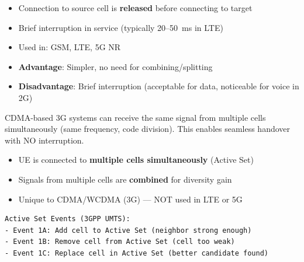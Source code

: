 
\begin{itemize}
\tightlist
\item
  Connection to source cell is \textbf{released} before connecting to target
\item
  Brief interruption in service (typically 20–50~ms in LTE)
\item
  Used in: GSM, LTE, 5G NR
\end{itemize}




\begin{itemize}
\tightlist
\item
  \textbf{Advantage}: Simpler, no need for combining/\allowbreak{}splitting
\item
  \textbf{Disadvantage}: Brief interruption (acceptable for data, noticeable for voice in 2G)
\end{itemize}



\CNchained{}

CDMA-based 3G systems can receive the same signal from multiple cells simultaneously (same frequency, code division). This enables seamless handover with NO interruption.


\begin{itemize}
\tightlist
\item
  UE is connected to \textbf{multiple cells simultaneously} (Active Set)
\item
  Signals from multiple cells are \textbf{combined} for diversity gain
\item
  Unique to CDMA/\allowbreak{}WCDMA (3G) — NOT used in LTE or 5G
\end{itemize}


\def\CNcodelang{}

\begin{CNplaincode}
\begin{Verbatim}
Active Set Events (3GPP UMTS):
- Event 1A: Add cell to Active Set (neighbor strong enough)
- Event 1B: Remove cell from Active Set (cell too weak)
- Event 1C: Replace cell in Active Set (better candidate found)
\end{Verbatim}
\end{CNplaincode}

